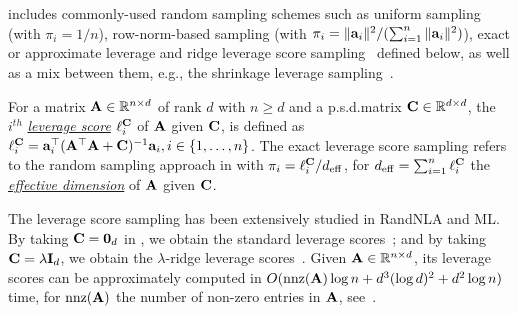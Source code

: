 \documentclass[11pt,a4paper]{article}
\begin{document}
 includes commonly-used random sampling schemes such as uniform sampling (with $\pi_i =1/n$), row-norm-based sampling (with $\pi_i = \| \mathbf{a}_i \|^2/( \sum_{i=1}^n \| \mathbf{a}_i \|^2 )$), exact or approximate leverage and ridge leverage score sampling~\citep{mahoney2011randomized,alaoui2015fast} defined below, as well as a mix between them, e.g., the shrinkage leverage sampling~\citep{ma2015statistical}. 
%
%
\begin{definition}\label{def:lev} 
For a matrix $\mathbf{A} \in {\mathbb{R}}^{n \times d}$ of rank $d$ with $n \geq d$ and a p.s.d.\@ matrix $\mathbf{C} \in {\mathbb{R}}^{d \times d}$, the $i^{th}$ \underline{\emph{leverage score}} $\ell^{\mathbf{C}}_i$ of $\mathbf{A}$ given $\mathbf{C}$, is defined as $\ell^{\mathbf{C}}_i = \mathbf{a}_i^\top(\mathbf{A}^\top\mathbf{A}+\mathbf{C})^{-1}\mathbf{a}_i, i \in \{ 1, \ldots, n \}$.
The exact leverage score sampling refers to the random sampling approach in  with $\pi_i=\ell^{\mathbf{C}}_i/d_{\mathrm{eff}}$, for $d_{\mathrm{eff}}= \sum_{i=1}^n \ell^{\mathbf{C}}_i$ the \underline{\emph{effective dimension}} of $\mathbf{A}$ given $\mathbf{C}$.  
\end{definition}
The leverage score sampling has been extensively studied in RandNLA and ML. 
By taking $\mathbf{C} = \mathbf{0}_d$ in , we obtain the standard leverage scores~\citep{mahoney2011randomized,drineas2012fast}; and by taking $\mathbf{C} = \lambda\mathbf{I}_d$, we obtain the $\lambda$-ridge leverage scores~\citep{alaoui2015fast}.
Given $\mathbf{A}\in{\mathbb{R}}^{n\times d}$, its leverage scores can be approximately computed in $O(\mathrm{nnz}(\mathbf{A})\log n + d^3 (\log d)^2+d^2\log n)$ time, for $\mathrm{nnz}(\mathbf{A})$ the number of non-zero entries in $\mathbf{A}$, see~\citet{drineas2012fast,clarkson2017low,cohen2017input}.
\end{document}
